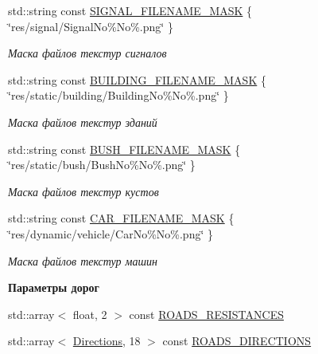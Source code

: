 \begin{Indent}
\begin{DoxyCompactItemize}
std\+::string const \hyperlink{namespacertm_aa9d61ca4243a3f2479f27c61535fcc9d}{S\+I\+G\+N\+A\+L\+\_\+\+F\+I\+L\+E\+N\+A\+M\+E\+\_\+\+M\+A\+SK} \{ \char`\"{}res/signal/Signal\+No\%No\%.png\char`\"{} \}
\begin{DoxyCompactList}\small\item\em Маска файлов текстур сигналов \end{DoxyCompactList}\item 
\mbox{\label{namespacertm_a7a49fe0b8d4f52458bfc22145e46faf5}} 
std\+::string const \hyperlink{namespacertm_a7a49fe0b8d4f52458bfc22145e46faf5}{B\+U\+I\+L\+D\+I\+N\+G\+\_\+\+F\+I\+L\+E\+N\+A\+M\+E\+\_\+\+M\+A\+SK} \{ \char`\"{}res/static/building/Building\+No\%No\%.png\char`\"{} \}
\begin{DoxyCompactList}\small\item\em Маска файлов текстур зданий \end{DoxyCompactList}\item 
\mbox{\label{namespacertm_a3739e886f219418af5924ad2e09d79dd}} 
std\+::string const \hyperlink{namespacertm_a3739e886f219418af5924ad2e09d79dd}{B\+U\+S\+H\+\_\+\+F\+I\+L\+E\+N\+A\+M\+E\+\_\+\+M\+A\+SK} \{ \char`\"{}res/static/bush/Bush\+No\%No\%.png\char`\"{} \}
\begin{DoxyCompactList}\small\item\em Маска файлов текстур кустов \end{DoxyCompactList}\item 
\mbox{\label{namespacertm_a72fea838addb841a6ea0173857a8eff1}} 
std\+::string const \hyperlink{namespacertm_a72fea838addb841a6ea0173857a8eff1}{C\+A\+R\+\_\+\+F\+I\+L\+E\+N\+A\+M\+E\+\_\+\+M\+A\+SK} \{ \char`\"{}res/dynamic/vehicle/Car\+No\%No\%.png\char`\"{} \}
\begin{DoxyCompactList}\small\item\em Маска файлов текстур машин \end{DoxyCompactList}\end{DoxyCompactItemize}
\end{Indent}
\begin{Indent}\textbf{ Параметры дорог}\par
\begin{DoxyCompactItemize}
\item 
std\+::array$<$ float, 2 $>$ const \hyperlink{namespacertm_a9f4d245ca5d201a5853914c175d0d17f}{R\+O\+A\+D\+S\+\_\+\+R\+E\+S\+I\+S\+T\+A\+N\+C\+ES}
\item 
std\+::array$<$ \hyperlink{namespacertm_a4776fbfe59834ff1a16838ad6735b69a}{Directions}, 18 $>$ const \hyperlink{namespacertm_a5820286728bf347e0320bdd9dc91ed1b}{R\+O\+A\+D\+S\+\_\+\+D\+I\+R\+E\+C\+T\+I\+O\+NS}
\end{DoxyCompactItemize}
\end{Indent}

